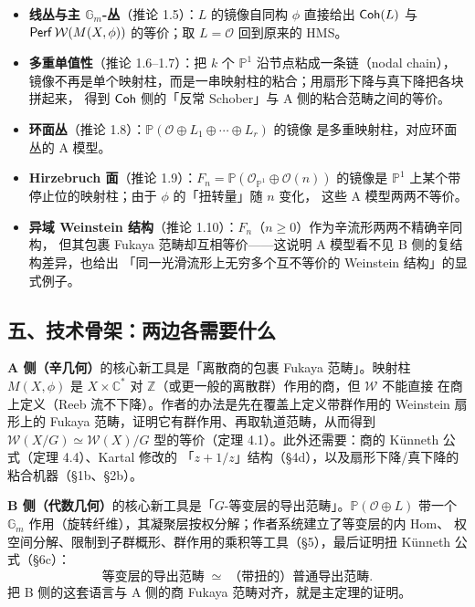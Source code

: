 \begin{itemize}
\item \textbf{线丛与主 $\mathbb{G}_m$-丛}（推论 1.5）：$L$ 的镜像自同构 $\phi$ 直接给出
      $\operatorname{\mathsf{Coh}}(L)$ 与 $\operatorname{\mathsf{Perf}}\mathcal{W}(M(X,\phi))$ 的等价；取 $L=\mathcal{O}$ 回到原来的 HMS。
\item \textbf{多重单值性}（推论 1.6–1.7）：把 $k$ 个 $\mathbb{P}^1$ 沿节点粘成一条链（nodal chain），
      镜像不再是单个映射柱，而是一串映射柱的粘合；用扇形下降与真下降把各块拼起来，
      得到 $\operatorname{\mathsf{Coh}}$ 侧的「反常 Schober」与 A 侧的粘合范畴之间的等价。
\item \textbf{环面丛}（推论 1.8）：$\mathbb{P}(\mathcal{O}\oplus L_1\oplus\cdots\oplus L_r)$ 的镜像
      是多重映射柱，对应环面丛的 A 模型。
\item \textbf{Hirzebruch 面}（推论 1.9）：$F_n=\mathbb{P}(\mathcal{O}_{\mathbb{P}^1}\oplus\mathcal{O}(n))$
      的镜像是 $\mathbb{P}^1$ 上某个带停止位的映射柱；由于 $\phi$ 的「扭转量」随 $n$ 变化，
      这些 A 模型两两不等价。
\item \textbf{异域 Weinstein 结构}（推论 1.10）：$F_n$（$n\ge0$）作为辛流形两两不精确辛同构，
      但其包裹 Fukaya 范畴却互相等价——这说明 A 模型看不见 B 侧的复结构差异，也给出
      「同一光滑流形上无穷多个互不等价的 Weinstein 结构」的显式例子。
\end{itemize}

\subsection*{五、技术骨架：两边各需要什么}

\textbf{A 侧（辛几何）}的核心新工具是「离散商的包裹 Fukaya 范畴」。映射柱 $M(X,\phi)$ 是
$X\times\mathbb{C}^*$ 对 $\mathbb{Z}$（或更一般的离散群）作用的商，但 $\mathcal{W}$ 不能直接
在商上定义（Reeb 流不下降）。作者的办法是先在覆盖上定义带群作用的 Weinstein 扇形上的
Fukaya 范畴，证明它有群作用、再取轨道范畴，从而得到 $\mathcal{W}(X/G)\simeq\mathcal{W}(X)/G$
型的等价（定理 4.1）。此外还需要：商的 Künneth 公式（定理 4.4）、Kartal 修改的
「$z+1/z$」结构（§4d），以及扇形下降/真下降的粘合机器（§1b、§2b）。

\textbf{B 侧（代数几何）}的核心新工具是「$G$-等变层的导出范畴」。$\mathbb{P}(\mathcal{O}\oplus L)$
带一个 $\mathbb{G}_m$ 作用（旋转纤维），其凝聚层按权分解；作者系统建立了等变层的内 Hom、
权空间分解、限制到子群概形、群作用的乘积等工具（§5），最后证明扭 Künneth 公式（§6c）：
\[
  \text{等变层的导出范畴}\;\simeq\;\text{（带扭的）普通导出范畴}.
\]
把 B 侧的这套语言与 A 侧的商 Fukaya 范畴对齐，就是主定理的证明。

